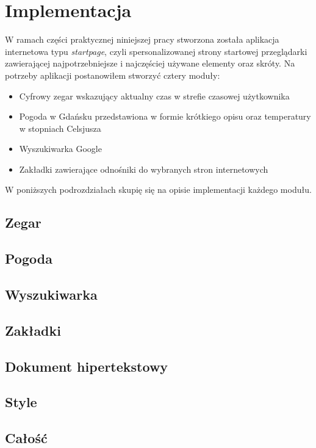 \documentclass[twoside,a4paper]{report}
\begin{document}
\chapter{Implementacja}
W ramach części praktycznej niniejszej pracy stworzona została aplikacja internetowa typu \textit{startpage}, czyli spersonalizowanej strony startowej przeglądarki zawierającej najpotrzebniejsze i najczęściej używane elementy oraz skróty.
Na potrzeby aplikacji postanowiłem stworzyć cztery moduły:
\begin{itemize}
    \item Cyfrowy zegar wskazujący aktualny czas w strefie czasowej użytkownika
    \item Pogoda w Gdańsku przedstawiona w formie krótkiego opisu oraz temperatury w stopniach Celsjusza
    \item Wyszukiwarka Google
    \item Zakładki zawierające odnośniki do wybranych stron internetowych
\end{itemize}

W poniższych podrozdziałach skupię się na opisie implementacji każdego modułu.

\section{Zegar}

\section{Pogoda}

\section{Wyszukiwarka}

\section{Zakładki}

\section{Dokument hipertekstowy}

\section{Style}

\section{Całość}
\end{document}
